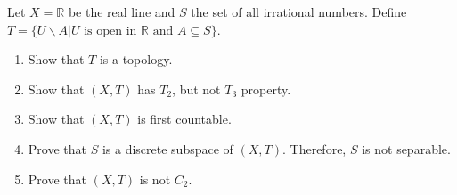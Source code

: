 \begin{problem}
Let $X=\mathbb{R}$ be the real line and $S$ the set of all irrational numbers. Define $T=\{U\backslash A | U \textrm{ is open in }\mathbb{R} \textrm{ and } A\subseteq S\}$.
\begin{enumerate}[label=(\alph*)]
\item Show that $T$ is a topology.
\item Show that $(X,T)$ has $T_2$, but not $T_3$ property.
\item Show that $(X,T)$ is first countable.
\item Prove that $S$ is a discrete subspace of $(X,T)$. Therefore, $S$ is not separable.
\item Prove that $(X,T)$ is not $C_2$.
\end{enumerate}
\end{problem}
